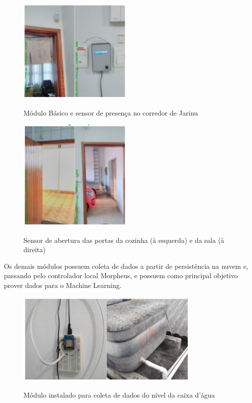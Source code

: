 \begin{figure}[H]
	\centering
	\caption{Módulo Básico e sensor de presença no corredor de Jarinu}
	\includegraphics[width=0.5\textwidth]{BasicSensorPresJarinu}
	\label{fig:BasicSensorPresJarinu}
\end{figure}

\begin{figure}[H]
	\centering
	\caption{Sensor de abertura das portas da cozinha (à esquerda) e da sala (à direita)}
	\includegraphics[width=0.5\textwidth]{SensorPortasJarinu}
	\label{fig:SensorPortasJarinu}
\end{figure}

Os demais módulos possuem coleta de dados a partir de persistência na nuvem e, passando pelo controlador local Morpheus, e possuem como principal objetivo prover dados para o Machine Learning.

\begin{figure}[H]
	\centering
	\caption{Módulo instalado para coleta de dados do nível da caixa d’água}
	\includegraphics[width=0.8\textwidth]{ModuloCxAgua}
	\label{fig:ModuloCxAgua}
\end{figure}

